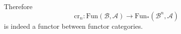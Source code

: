 Therefore
\begin{equation}
    \text{cr}_n:\text{Fun}(\mathcal{B},\mathcal{A})\rightarrow \text{Fun}_*(\mathcal{B}^n,\mathcal{A})
\end{equation}
is indeed a functor between functor categories.


